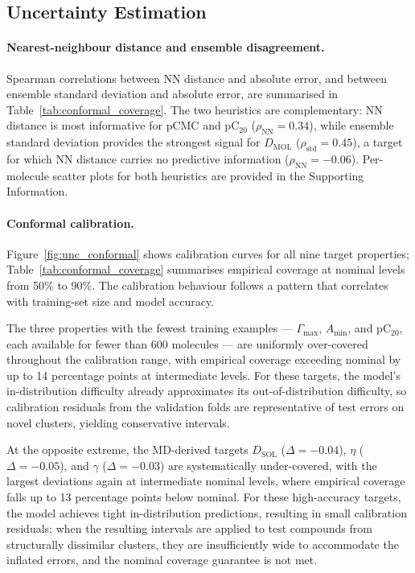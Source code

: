 \documentclass[11pt]{aime}
\begin{document}

\subsection{Uncertainty Estimation}
\label{sec:results:uncertainty}

\paragraph{Nearest-neighbour distance and ensemble disagreement.}
Spearman correlations between NN distance and absolute error, and between ensemble standard deviation and absolute error, are summarised in Table~\ref{tab:conformal_coverage}.
The two heuristics are complementary: NN distance is most informative for pCMC and pC$_{20}$ ($\rho_{\mathrm{NN}} = 0.34$), while ensemble standard deviation provides the strongest signal for $D_{\mathrm{MOL}}$ ($\rho_{\mathrm{std}} = 0.45$), a target for which NN distance carries no predictive information ($\rho_{\mathrm{NN}} = -0.06$).
Per-molecule scatter plots for both heuristics are provided in the Supporting Information.

\paragraph{Conformal calibration.}
Figure~\ref{fig:unc_conformal} shows calibration curves for all nine target properties;
Table~\ref{tab:conformal_coverage} summarises empirical coverage at nominal levels from 50\% to 90\%.
The calibration behaviour follows a pattern that correlates with training-set size and model accuracy.

The three properties with the fewest training examples --- $\Gamma_{\max}$, $A_{\min}$, and pC$_{20}$, each available for fewer than 600 molecules --- are uniformly over-covered throughout the calibration range, with empirical coverage exceeding nominal by up to 14 percentage points at intermediate levels.
For these targets, the model's in-distribution difficulty already approximates its out-of-distribution difficulty, so calibration residuals from the validation folds are representative of test errors on novel clusters, yielding conservative intervals.

At the opposite extreme, the MD-derived targets $D_{\mathrm{SOL}}$ ($\Delta = -0.04$), $\eta$ ($\Delta = -0.05$), and $\gamma$ ($\Delta = -0.03$) are systematically under-covered, with the largest deviations again at intermediate nominal levels, where empirical coverage falls up to 13 percentage points below nominal.
For these high-accuracy targets, the model achieves tight in-distribution predictions, resulting in small calibration residuals;
when the resulting intervals are applied to test compounds from structurally dissimilar clusters, they are insufficiently wide to accommodate the inflated errors, and the nominal coverage guarantee is not met.
\end{document}
